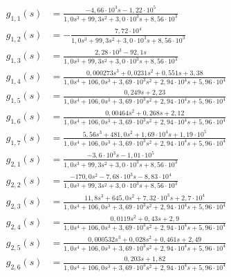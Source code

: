 \begin{landscape}
  \begin{align}
    g_{1,1}(s) &= \frac{- 4{,}66 \cdot 10^{3} s - 1{,}22 \cdot 10^{5}}{1{,}0 s^{3} + 99{,}3 s^{2} + 3{,}0 \cdot 10^{3} s + 8{,}56 \cdot 10^{3}} \\
    g_{1,2}(s) &= - \frac{7{,}72 \cdot 10^{4}}{1{,}0 s^{3} + 99{,}3 s^{2} + 3{,}0 \cdot 10^{3} s + 8{,}56 \cdot 10^{3}} \\
    g_{1,3}(s) &= \frac{2{,}28 \cdot 10^{3} - 92{,}1 s}{1{,}0 s^{3} + 99{,}3 s^{2} + 3{,}0 \cdot 10^{3} s + 8{,}56 \cdot 10^{3}} \label{eq:g13} \\
    g_{1,4}(s) &= \frac{0{,}000273 s^{3} + 0{,}0231 s^{2} + 0{,}551 s + 3{,}38}{1{,}0 s^{4} + 106{,}0 s^{3} + 3{,}69 \cdot 10^{3} s^{2} + 2{,}94 \cdot 10^{4} s + 5{,}96 \cdot 10^{4}} \\
    g_{1,5}(s) &= \frac{0{,}249 s + 2{,}23}{1{,}0 s^{4} + 106{,}0 s^{3} + 3{,}69 \cdot 10^{3} s^{2} + 2{,}94 \cdot 10^{4} s + 5{,}96 \cdot 10^{4}} \\
    g_{1,6}(s) &= \frac{0{,}00464 s^{2} + 0{,}268 s + 2{,}12}{1{,}0 s^{4} + 106{,}0 s^{3} + 3{,}69 \cdot 10^{3} s^{2} + 2{,}94 \cdot 10^{4} s + 5{,}96 \cdot 10^{4}} \\
    g_{1,7}(s) &= \frac{5{,}56 s^{3} + 481{,}0 s^{2} + 1{,}69 \cdot 10^{4} s + 1{,}19 \cdot 10^{5}}{1{,}0 s^{4} + 106{,}0 s^{3} + 3{,}69 \cdot 10^{3} s^{2} + 2{,}94 \cdot 10^{4} s + 5{,}96 \cdot 10^{4}} \\
    g_{2,1}(s) &= \frac{- 3{,}6 \cdot 10^{3} s - 1{,}01 \cdot 10^{5}}{1{,}0 s^{3} + 99{,}3 s^{2} + 3{,}0 \cdot 10^{3} s + 8{,}56 \cdot 10^{3}} \\
    g_{2,2}(s) &= \frac{- 170{,}0 s^{2} - 7{,}68 \cdot 10^{3} s - 8{,}83 \cdot 10^{4}}{1{,}0 s^{3} + 99{,}3 s^{2} + 3{,}0 \cdot 10^{3} s + 8{,}56 \cdot 10^{3}} \\
    g_{2,3}(s) &= \frac{11{,}8 s^{3} + 645{,}0 s^{2} + 7{,}32 \cdot 10^{3} s + 2{,}7 \cdot 10^{4}}{1{,}0 s^{4} + 106{,}0 s^{3} + 3{,}69 \cdot 10^{3} s^{2} + 2{,}94 \cdot 10^{4} s + 5{,}96 \cdot 10^{4}} \\
    g_{2,4}(s) &= \frac{0{,}0119 s^{2} + 0{,}43 s + 2{,}9}{1{,}0 s^{4} + 106{,}0 s^{3} + 3{,}69 \cdot 10^{3} s^{2} + 2{,}94 \cdot 10^{4} s + 5{,}96 \cdot 10^{4}} \\
    g_{2,5}(s) &= \frac{0{,}000532 s^{3} + 0{,}028 s^{2} + 0{,}461 s + 2{,}49}{1{,}0 s^{4} + 106{,}0 s^{3} + 3{,}69 \cdot 10^{3} s^{2} + 2{,}94 \cdot 10^{4} s + 5{,}96 \cdot 10^{4}} \\
    g_{2,6}(s) &= \frac{0{,}203 s + 1{,}82}{1{,}0 s^{4} + 106{,}0 s^{3} + 3{,}69 \cdot 10^{3} s^{2} + 2{,}94 \cdot 10^{4} s + 5{,}96 \cdot 10^{4}} \\

\end{align}
\end{landscape}
